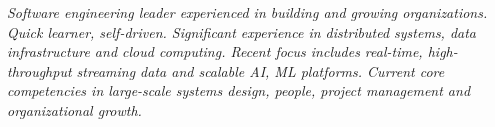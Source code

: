 {\selectfont
	\begin{justify}\textit{Software engineering leader experienced in building and growing organizations. Quick learner, self-driven. Significant experience in distributed systems, data infrastructure and cloud computing. Recent focus includes real-time, high-throughput streaming data and scalable AI, ML platforms. Current core competencies in large-scale systems design, people, project management and organizational growth.}\end{justify}
}